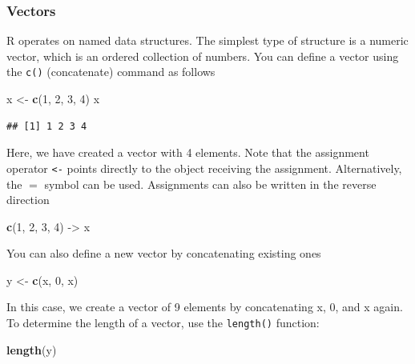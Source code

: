 \documentclass[
]{article}
\newenvironment{Shaded}{\begin{snugshade}}{\end{snugshade}}
\newcommand{\DecValTok}[1]{\textcolor[rgb]{0.00,0.00,0.81}{#1}}
\newcommand{\FunctionTok}[1]{\textcolor[rgb]{0.13,0.29,0.53}{\textbf{#1}}}
\newcommand{\NormalTok}[1]{#1}
\newcommand{\OtherTok}[1]{\textcolor[rgb]{0.56,0.35,0.01}{#1}}
\begin{document}
\hypertarget{vectors}{%
\subsubsection{Vectors}\label{vectors}}

R operates on named data structures. The simplest type of structure is a
numeric vector, which is an ordered collection of numbers. You can
define a vector using the \texttt{c()} (concatenate) command as follows

\begin{Shaded}
\begin{Highlighting}[]
\NormalTok{x }\OtherTok{\textless{}{-}} \FunctionTok{c}\NormalTok{(}\DecValTok{1}\NormalTok{, }\DecValTok{2}\NormalTok{, }\DecValTok{3}\NormalTok{, }\DecValTok{4}\NormalTok{)}
\NormalTok{x}
\end{Highlighting}
\end{Shaded}

\begin{verbatim}
## [1] 1 2 3 4
\end{verbatim}

Here, we have created a vector with 4 elements. Note that the assignment
operator \texttt{\textless{}-} points directly to the object receiving
the assignment. Alternatively, the \(=\) symbol can be used. Assignments
can also be written in the reverse direction

\begin{Shaded}
\begin{Highlighting}[]
\FunctionTok{c}\NormalTok{(}\DecValTok{1}\NormalTok{, }\DecValTok{2}\NormalTok{, }\DecValTok{3}\NormalTok{, }\DecValTok{4}\NormalTok{) }\OtherTok{{-}\textgreater{}}\NormalTok{ x}
\end{Highlighting}
\end{Shaded}

You can also define a new vector by concatenating existing ones

\begin{Shaded}
\begin{Highlighting}[]
\NormalTok{y }\OtherTok{\textless{}{-}} \FunctionTok{c}\NormalTok{(x, }\DecValTok{0}\NormalTok{, x)}
\end{Highlighting}
\end{Shaded}

In this case, we create a vector of 9 elements by concatenating x, 0,
and x again. To determine the length of a vector, use the
\texttt{length()} function:

\begin{Shaded}
\begin{Highlighting}[]
\FunctionTok{length}\NormalTok{(y)}
\end{Highlighting}
\end{Shaded}
\end{document}
